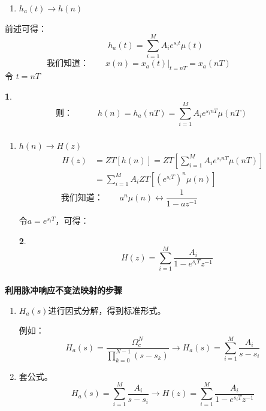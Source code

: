 \documentclass[notheorems,compress,mathserif,table]{beamer}
\newtheorem{dablock}{}
\begin{document}
\begin{frame}[shrink]\frametitle{}%
\begin{enumerate}
    \item [2] $h_a(t)\longrightarrow h(n)$%
\end{enumerate}
    前述可得：
    $$h_a(t) = \sum_{i=1}^{M}A_{i}e^{s_{i}t}\mu(t)$$
    $$\mbox{我们知道：}  \quad\quad x(n)=x_a(t)|_{t=nT} = x_a(nT)\quad\quad\quad\quad$$
    \quad\quad 令 $t=nT$
    \begin{dablock}
    $$\mbox{则：}\quad\quad\quad h(n)=h_a(nT)= \sum_{i=1}^{M}A_{i}e^{s_{i}nT}\mu(nT)
    \quad$$
    \end{dablock}
\end{frame}
%
%
\begin{frame}[shrink]\frametitle{}%
\begin{enumerate}
    \item [3] $h(n)\longrightarrow H(z)$
    \begin{equation*}
        \begin{split}
            H(z) &= ZT[h(n)]= ZT\left[\sum_{i=1}^{M}A_{i}e^{s_{i}nT}\mu(nT)\right]\\
            &= \sum_{i=1}^{M}A_{i}ZT\left[\left(e^{s_{i}T}\right)^n\mu(n)\right]
        \end{split}
    \end{equation*}
    $$\mbox{我们知道：}\quad\quad a^n\mu(n)\longleftrightarrow \frac{1}{1-az^{-1}}
    \quad\quad\quad\quad\quad\quad\quad\quad$$
    \par\quad  令$a= e^{s_{i}T}$，可得：
    \begin{dablock}
    $$\quad H(z) = \sum_{i=1}^{M}\frac{A_{i}}{1-e^{s_{i}T}z^{-1}}$$
    \end{dablock}
\end{enumerate}
\end{frame}
%
%
\begin{frame}[shrink]\frametitle{}%
\textbf{利用脉冲响应不变法映射的步骤}
\begin{enumerate}
\item $H_a(s)$进行因式分解，得到标准形式。
      \par 例如：
      $$ H_{a}(s) = \frac{\Omega_{c}^{N}}{\prod^{N-1}_{k=0}(s-s_{k})}  \longrightarrow H_a(s)= \sum_{i=1}^{M}\frac{A_i}{s-s_i}$$
\item 套公式。
      $$H_a(s)= \sum_{i=1}^{M}\frac{A_i}{s-s_i}\longrightarrow H(z) = \sum_{i=1}^{M}\frac{A_{i}}{1-e^{s_{i}T}z^{-1}}$$
\end{enumerate}
\end{frame}
\end{document}
